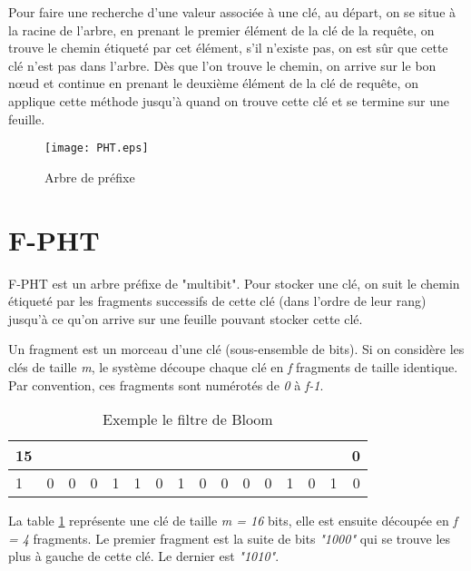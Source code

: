\documentclass[a4paper,11pt]{report}
\begin{document}
	Pour faire une recherche d'une valeur associée à une clé, au départ, on se situe à la racine de l'arbre, en prenant le premier élément de la clé de la requête, on trouve le chemin étiqueté par cet élément, s'il n'existe pas, on est sûr que cette clé n'est pas dans l'arbre. Dès que l'on trouve le chemin, on arrive sur le bon nœud et continue en prenant le deuxième élément de la clé de requête, on applique cette méthode jusqu'à quand on trouve cette clé et se termine sur une feuille.
	
	\begin{figure}[!htbp]
	\centering
	\texttt{[image: PHT.eps]}
	\caption{Arbre de préfixe}
	\label{PHT}
	\end{figure}	

\newpage	
	
\section{F-PHT}
	F-PHT est un arbre préfixe de "multibit". Pour stocker une clé, on suit le chemin étiqueté par les fragments successifs de cette clé (dans l'ordre de leur rang) jusqu'à ce qu'on arrive sur une feuille pouvant stocker cette clé.

	Un fragment est un morceau d'une clé (sous-ensemble de bits). Si on considère les clés de taille \textit{m}, le système découpe chaque clé en \textit{f} fragments de taille identique. Par convention, ces fragments sont numérotés de \textit{0} à \textit{f-1}.
	
	\begin{table}[!h]
		\centering		
		\begin{tabular}{|l|*{14}{c|}r|}
		\multicolumn{1}{c}{{\scriptsize 15}} &\multicolumn{1}{c}{}&\multicolumn{1}{c}{}&\multicolumn{1}{c}{}&
		\multicolumn{1}{c}{}&\multicolumn{1}{c}{}&\multicolumn{1}{c}{}&\multicolumn{1}{c}{}&
		\multicolumn{1}{c}{}&\multicolumn{1}{c}{}&\multicolumn{1}{c}{}&\multicolumn{1}{c}{}&
		\multicolumn{1}{c}{}&\multicolumn{1}{c}{}&\multicolumn{1}{c}{}&\multicolumn{1}{c}{{\scriptsize 0}}\\
		\hline
			1 & 0 & 0 & \multicolumn{1}{c||}{0} & 
			1 & 1 & 0 & \multicolumn{1}{c||}{1} & 
			0 & 0 & 0 & \multicolumn{1}{c||}{0} & 
			1 & 0 & 1 & 0 \\
		\hline
		\end{tabular}
		\caption{Exemple le filtre de Bloom}
		\label{fragment/filtredeBloom}
	\end{table}
	
	La table \ref{fragment/filtredeBloom} représente une clé de taille \textit{m = 16} bits, elle est ensuite découpée en \textit{f = 4} fragments. Le premier fragment est la suite de bits \textit{"1000"} qui se trouve les plus à gauche de cette clé. Le dernier est \textit{"1010"}.
	
\end{document}
